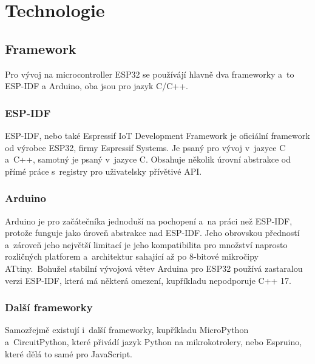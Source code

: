 \chapter{Technologie}

\section{Framework}

Pro vývoj na microcontroller ESP32 se používájí hlavně dva frameworky a~to ESP-IDF\cite{ESP-IDF} a Arduino\cite{arduino}, oba jsou pro jazyk C/C++.

\subsection{ESP-IDF}

ESP-IDF, nebo také Espressif IoT Development Framework je oficiální framework od výrobce ESP32, firmy Espressif Systems\cite{espressif}.
Je psaný pro vývoj v~jazyce C a~C++, samotný je psaný v~jazyce C.
Obsahuje několik úrovní abstrakce od přímé práce s~registry pro uživatelsky přívětivé API.





\subsection{Arduino}

Arduino je pro začátečníka jednoduší na pochopení a~na práci než ESP-IDF, protože funguje jako úroveň abstrakce nad ESP-IDF.
Jeho obrovskou předností a~zároveň jeho největší limitací je jeho kompatibilita pro množství naprosto rozličných platforem a~architektur sahající až po 8-bitové mikročipy ATtiny.~Bohužel stabilní vývojová větev Arduina pro ESP32 používá zastaralou verzi ESP-IDF, která má některá omezení, kupříkladu nepodporuje C++ 17.



\subsection{Další frameworky}

Samozřejmě existují i~další frameworky, kupříkladu MicroPython\cite{uPython} a~CircuitPython\cite{circuitPython}, které přivádí jazyk Python na mikrokotrolery, nebo Espruino\cite{espruino}, které dělá to samé pro JavaScript.


